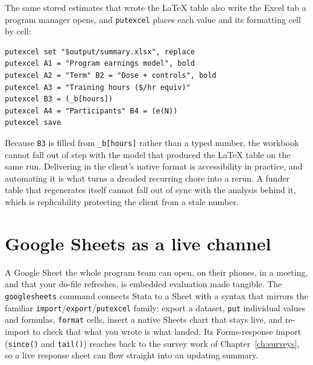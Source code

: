 \documentclass[
    a4paper,
    fontsize=10pt,
    twoside=true,
    numbers=noenddot,
]{kaobook}
\begin{document}
The same stored estimates that wrote the \LaTeX{} table also write the Excel tab a program manager opens, and \texttt{putexcel} places each value and its formatting cell by cell:
{\footnotesize
\begin{verbatim}
putexcel set "$output/summary.xlsx", replace
putexcel A1 = "Program earnings model", bold
putexcel A2 = "Term" B2 = "Dose + controls", bold
putexcel A3 = "Training hours ($/hr equiv)"
putexcel B3 = (_b[hours])
putexcel A4 = "Participants" B4 = (e(N))
putexcel save
\end{verbatim}
}
Because \texttt{B3} is filled from \texttt{\_b[hours]} rather than a typed number, the workbook cannot fall out of step with the model that produced the \LaTeX{} table on the same run. Delivering in the client's native format is accessibility in practice, and automating it is what turns a dreaded recurring chore into a rerun. A funder table that regenerates itself cannot fall out of sync with the analysis behind it, which is replicability protecting the client from a stale number.

\section{Google Sheets as a live channel}
A Google Sheet the whole program team can open, on their phones, in a meeting, and that your do-file refreshes, is embedded evaluation made tangible. The \texttt{googlesheets} command connects Stata to a Sheet with a syntax that mirrors the familiar \texttt{import}/\texttt{export}/\texttt{putexcel} family: export a dataset, \texttt{put} individual values and formulas, \texttt{format} cells, insert a native Sheets chart that stays live, and re-import to check that what you wrote is what landed. Its Forms-response import (\texttt{since()} and \texttt{tail()}) reaches back to the survey work of Chapter~\ref{ch:surveys}, so a live response sheet can flow straight into an updating summary.
\end{document}
